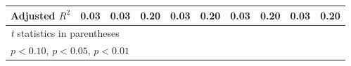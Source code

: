 \begin{table}[htbp]
\begin{tabular}{l*{9}{c}}
Adjusted \(R^{2}\)&     0.03         &     0.03         &     0.20         &     0.03         &     0.20         &     0.03         &     0.20         &     0.03         &     0.20         \\
\hline\hline
\multicolumn{10}{l}{\footnotesize \textit{t} statistics in parentheses}\\
\multicolumn{10}{l}{\footnotesize \sym{*} \(p<0.10\), \sym{**} \(p<0.05\), \sym{***} \(p<0.01\)}\\
\end{tabular}
\end{table}
